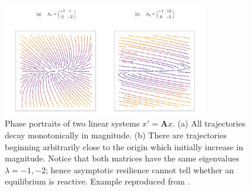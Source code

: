 \begin{figure}[ht]
	\centering
	\captionsetup{width=0.8\linewidth}
	\includegraphics[width=0.8\textwidth]{figs/positive_reactivity_real_example}
	\caption{Phase portraits of two linear systems $x' = \textbf{A}x$. (a) All trajectories decay monotonically in magnitude. (b) There are trajectories beginning arbitrarily close to the origin which initially increase in magnitude. Notice that both matrices have the same eigenvalues $\lambda = -1, -2$; hence asymptotic resilience cannot tell whether an equilibrium is reactive. Example reproduced from \cite{neubertAlternativesResilienceMeasuring1997a}.}
	
	\label{fig:reactivity}
\end{figure} 